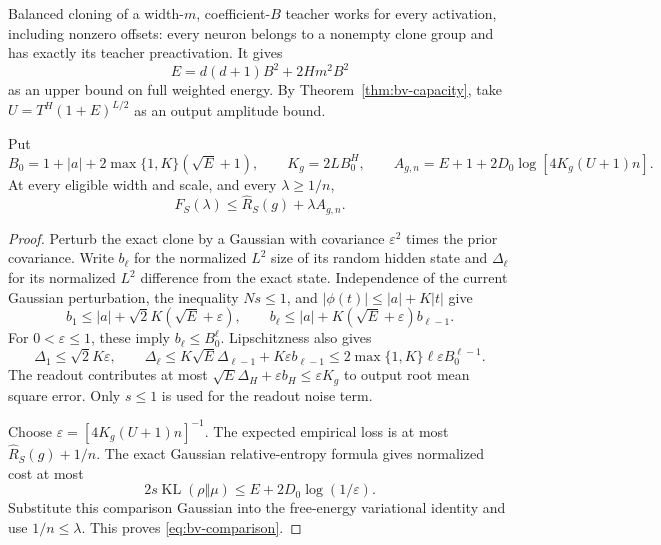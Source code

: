 Balanced cloning of a width-$m$, coefficient-$B$ teacher works for every activation, including nonzero offsets: every neuron belongs to a nonempty clone group and has exactly its teacher preactivation. It gives
\[
 E=d(d+1)B^2+2Hm^2B^2
\]
as an upper bound on full weighted energy. By Theorem~\ref{thm:bv-capacity}, take $U=T^H(1+E)^{L/2}$ as an output amplitude bound.

\begin{lemma}
\label{lem:bv-comparison}
Put
\[
 B_0=1+|a|+2\max\{1,K\}(\sqrt E+1),\qquad
 K_g=2L B_0^H,\qquad
 A_{g,n}=E+1+2D_0\log[4K_g(U+1)n].
\]
At every eligible width and scale, and every $\lambda\ge1/n$,
\begin{equation}
 F_S(\lambda)\le\widehat R_S(g)+\lambda A_{g,n}.
 \label{eq:bv-comparison}
\end{equation}
\end{lemma}
\begin{proof}
Perturb the exact clone by a Gaussian with covariance $\varepsilon^2$ times the prior covariance. Write $b_\ell$ for the normalized $L^2$ size of its random hidden state and $\Delta_\ell$ for its normalized $L^2$ difference from the exact state. Independence of the current Gaussian perturbation, the inequality $Ns\le1$, and $|\phi(t)|\le|a|+K|t|$ give
\[
 b_1\le|a|+\sqrt2K(\sqrt E+\varepsilon),\qquad
 b_\ell\le|a|+K(\sqrt E+\varepsilon)b_{\ell-1}.
\]
For $0<\varepsilon\le1$, these imply $b_\ell\le B_0^\ell$. Lipschitzness also gives
\[
 \Delta_1\le\sqrt2K\varepsilon,\qquad
 \Delta_\ell\le K\sqrt E\Delta_{\ell-1}+K\varepsilon b_{\ell-1}
 \le2\max\{1,K\}\ell\varepsilon B_0^{\ell-1}.
\]
The readout contributes at most $\sqrt E\Delta_H+\varepsilon b_H\le\varepsilon K_g$ to output root mean square error. Only $s\le1$ is used for the readout noise term.

Choose $\varepsilon=[4K_g(U+1)n]^{-1}$. The expected empirical loss is at most $\widehat R_S(g)+1/n$. The exact Gaussian relative-entropy formula gives normalized cost at most
\[
 2s\operatorname{KL}(\rho\Vert\mu)
 \le E+2D_0\log(1/\varepsilon).
\]
Substitute this comparison Gaussian into the free-energy variational identity and use $1/n\le\lambda$. This proves \eqref{eq:bv-comparison}.
\end{proof}

